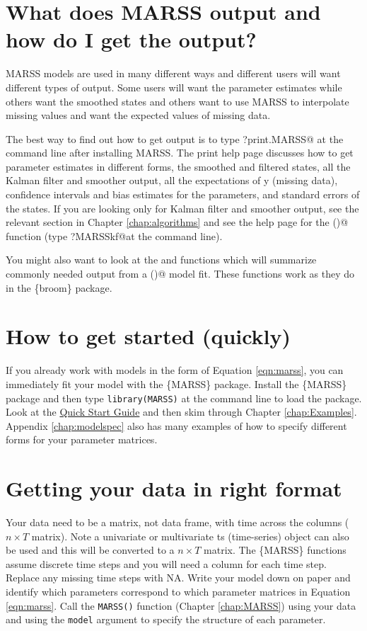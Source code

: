 \section{What does MARSS output and how do I get the output?}
MARSS models are used in many different ways and different users will want different types of output.  Some users will want the parameter estimates while others want the smoothed states and others want to use MARSS to interpolate missing values and want the expected values of missing data.  

The best way to find out how to get output is to type \verb@?print.MARSS@ at the command line after installing MARSS.  The print help page discusses how to get parameter estimates in different forms, the smoothed and filtered states, all the Kalman filter and smoother output, all the expectations of y (missing data), confidence intervals and bias estimates for the parameters, 
and standard errors of the states.  If you are looking only for Kalman filter and smoother output, see the relevant section in Chapter \ref{chap:algorithms} and see the help page for the \verb@MARSSkf()@ function (type \verb@?MARSSkf@at the \R command line).

You might also want to look at the \verb@tidy@ and \verb@glance@ functions which will summarize commonly needed output from a \verb@MARSS()@ model fit.  These functions work as they do in the \{broom\} \R package.

\section{How to get started (quickly)}

If you already work with models in the form of Equation \ref{eqn:marss}, you can immediately fit your model with the \{MARSS\} package.  Install the \{MARSS\} package and then type \texttt{library(MARSS)} at the command line to load the package.  Look at the \href{https://CRAN.R-project.org/package=MARSS/vignettes/Quick_Start.pdf}{Quick Start Guide} and then skim through Chapter \ref{chap:Examples}.  Appendix \ref{chap:modelspec} also has many examples of how to specify different forms for your parameter matrices. 

\section{Getting your data in right format}
Your data need to be a matrix, not data frame, with time across the columns ($n \times T$ matrix). Note a univariate or multivariate ts (time-series) object can also be used and this will be converted to a $n \times T$ matrix. The \{MARSS\} functions assume discrete time steps and you will need a column for each time step.  Replace any missing time steps with NA.  Write your model down on paper and identify which parameters correspond to which parameter matrices in Equation \ref{eqn:marss}.  Call the \texttt{MARSS()} function (Chapter \ref{chap:MARSS}) using your data and using the \texttt{model} argument to specify the structure of each parameter. 

